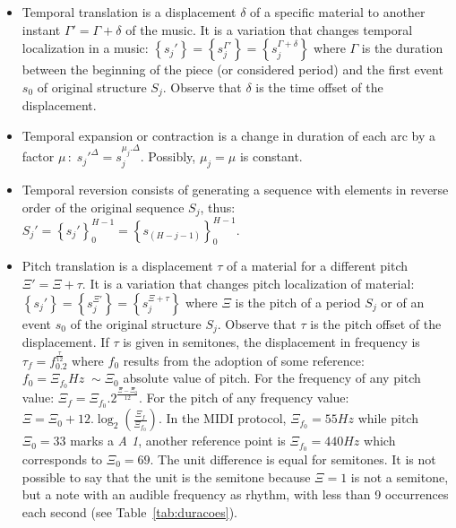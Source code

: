 \documentclass[
 aip,
 jmp,
 amsmath,amssymb,
 reprint,
]{revtex4-1}
\begin{document}
\begin{itemize}
        \item Temporal translation is a displacement
    $\delta$ of a specific material to another instant $\Gamma'=\Gamma + \delta$
    of the music. It is a variation that changes temporal localization in
    a music:
    $\left\{s_j'\right\}=\left\{s_j^{\Gamma'}\right\}=\left\{s_j^{\Gamma+\delta}\right\}$
    where $\Gamma$ is the duration between the beginning of the piece (or considered
    period) and the first event $s_0$ of original structure $S_j$. Observe that
    $\delta$ is the time offset of the displacement.

    \item Temporal expansion or contraction is a change in duration of each
    arc by a factor $\mu\,:\; s_j'^{\Delta}=s_j^{\mu_j . \Delta}$. Possibly,
    $\mu_j=\mu$ is constant.

    \item Temporal reversion consists of generating a sequence with elements
    in reverse order of the original sequence $S_j$, thus: $S_j'=\left\{s_j'\right\}_0^{H-1}=\left\{s_{(H-j-1)}\right\}_0^{H-1}$.

    \item Pitch translation is a displacement $\tau$ of a material for a
        different pitch $\Xi'=\Xi + \tau$. It is a variation that changes pitch
        localization of material:
        $\left\{s_j'\right\}=\left\{s_j^{\Xi'}\right\}=\left\{s_j^{\Xi+\tau}\right\}$
        where $\Xi$ is the pitch of a period $S_j$ or of an event $s_0$ of the
        original structure $S_j$. Observe that $\tau$ is the pitch offset of the
        displacement. If $\tau$ is given in semitones, the displacement in
        frequency is $\tau_f=f_0.2^{\frac{\tau}{12}}$ where $f_0$ results from
        the adoption of some reference: $f_0=\Xi_{f_0}Hz\;\sim \Xi_0$ absolute
        value of pitch. For the frequency of any pitch value: $\Xi_f=\Xi_{f_0}.2^{\frac{\Xi-\Xi_0}{12}}$. 
        For the pitch of any frequency value: $\Xi=\Xi_0 +12
        . \log_2\left(\frac{\Xi_f}{\Xi_{f_0}}\right)$.  
        In the MIDI protocol, $\Xi_{f_0}=55Hz$ while pitch $\Xi_0=33$ marks
        a \textit{A 1}, another reference point is $\Xi_{f_0}=440Hz$ which
        corresponds to $\Xi_0=69$. The unit difference is equal for semitones.
        It is not possible to say that the unit is the semitone because $\Xi=1$
        is not a semitone, but a note with an audible frequency as rhythm, with
        less than 9 occurrences each second (see Table~\ref{tab:duracoes}).


\end{itemize}
\end{document}
